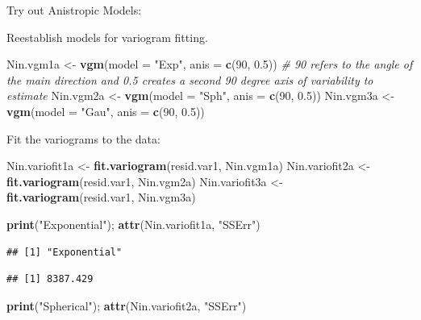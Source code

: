 \documentclass[]{book}
\newenvironment{Shaded}{\begin{snugshade}}{\end{snugshade}}
\newcommand{\CommentTok}[1]{\textcolor[rgb]{0.56,0.35,0.01}{\textit{#1}}}
\newcommand{\DataTypeTok}[1]{\textcolor[rgb]{0.13,0.29,0.53}{#1}}
\newcommand{\DecValTok}[1]{\textcolor[rgb]{0.00,0.00,0.81}{#1}}
\newcommand{\FloatTok}[1]{\textcolor[rgb]{0.00,0.00,0.81}{#1}}
\newcommand{\KeywordTok}[1]{\textcolor[rgb]{0.13,0.29,0.53}{\textbf{#1}}}
\newcommand{\NormalTok}[1]{#1}
\newcommand{\StringTok}[1]{\textcolor[rgb]{0.31,0.60,0.02}{#1}}
\begin{document}
Try out Anistropic Models:

Reestablish models for variogram fitting.

\begin{Shaded}
\begin{Highlighting}[]
\NormalTok{Nin.vgm1a <-}\StringTok{ }\KeywordTok{vgm}\NormalTok{(}\DataTypeTok{model =} \StringTok{"Exp"}\NormalTok{, }\DataTypeTok{anis =} \KeywordTok{c}\NormalTok{(}\DecValTok{90}\NormalTok{, }\FloatTok{0.5}\NormalTok{)) }\CommentTok{# 90 refers to the angle of the main direction and 0.5 creates a second 90 degree axis of variability to estimate }
\NormalTok{Nin.vgm2a <-}\StringTok{ }\KeywordTok{vgm}\NormalTok{(}\DataTypeTok{model =} \StringTok{"Sph"}\NormalTok{, }\DataTypeTok{anis =} \KeywordTok{c}\NormalTok{(}\DecValTok{90}\NormalTok{, }\FloatTok{0.5}\NormalTok{))}
\NormalTok{Nin.vgm3a <-}\StringTok{ }\KeywordTok{vgm}\NormalTok{(}\DataTypeTok{model =} \StringTok{"Gau"}\NormalTok{, }\DataTypeTok{anis =} \KeywordTok{c}\NormalTok{(}\DecValTok{90}\NormalTok{, }\FloatTok{0.5}\NormalTok{))}
\end{Highlighting}
\end{Shaded}

Fit the variograms to the data:

\begin{Shaded}
\begin{Highlighting}[]
\NormalTok{Nin.variofit1a <-}\StringTok{ }\KeywordTok{fit.variogram}\NormalTok{(resid.var1, Nin.vgm1a)}
\NormalTok{Nin.variofit2a <-}\StringTok{ }\KeywordTok{fit.variogram}\NormalTok{(resid.var1, Nin.vgm2a)}
\NormalTok{Nin.variofit3a <-}\StringTok{ }\KeywordTok{fit.variogram}\NormalTok{(resid.var1, Nin.vgm3a)}

\KeywordTok{print}\NormalTok{(}\StringTok{"Exponential"}\NormalTok{); }\KeywordTok{attr}\NormalTok{(Nin.variofit1a, }\StringTok{"SSErr"}\NormalTok{)}
\end{Highlighting}
\end{Shaded}

\begin{verbatim}
## [1] "Exponential"
\end{verbatim}

\begin{verbatim}
## [1] 8387.429
\end{verbatim}

\begin{Shaded}
\begin{Highlighting}[]
\KeywordTok{print}\NormalTok{(}\StringTok{"Spherical"}\NormalTok{); }\KeywordTok{attr}\NormalTok{(Nin.variofit2a, }\StringTok{"SSErr"}\NormalTok{)}
\end{Highlighting}
\end{Shaded}
\end{document}
